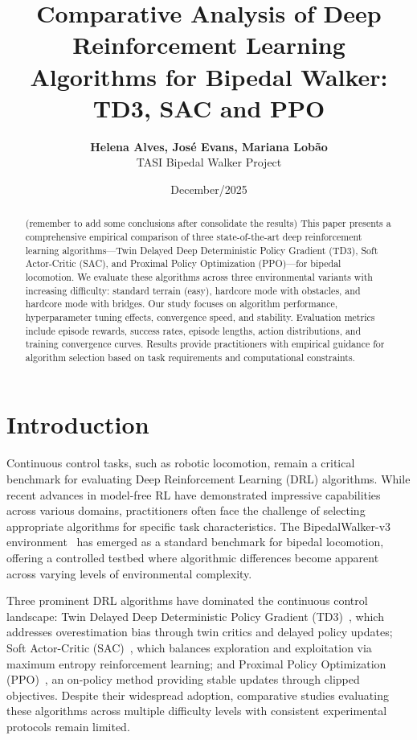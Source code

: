 \documentclass[10pt,a4paper,twocolumn]{article}
\title{Comparative Analysis of Deep Reinforcement Learning Algorithms for Bipedal Walker: TD3, SAC and PPO}
\author{
    \textbf{Helena Alves, José Evans, Mariana Lobão}\\
    TASI Bipedal Walker Project
}
\date{December/2025}
\begin{document}
\maketitle

\begin{abstract}
(remember to add some conclusions after consolidate the results) This paper presents a comprehensive empirical comparison of three state-of-the-art deep reinforcement learning algorithms---Twin Delayed Deep Deterministic Policy Gradient (TD3), Soft Actor-Critic (SAC), and Proximal Policy Optimization (PPO)---for bipedal locomotion. We evaluate these algorithms across three environmental variants with increasing difficulty: standard terrain (easy), hardcore mode with obstacles, and hardcore mode with bridges. Our study focuses on algorithm performance, hyperparameter tuning effects, convergence speed, and stability. Evaluation metrics include episode rewards, success rates, episode lengths, action distributions, and training convergence curves. Results provide practitioners with empirical guidance for algorithm selection based on task requirements and computational constraints.
\end{abstract}

\section{Introduction}

Continuous control tasks, such as robotic locomotion, remain a critical benchmark for evaluating Deep Reinforcement Learning (DRL) algorithms. While recent advances in model-free RL have demonstrated impressive capabilities across various domains, practitioners often face the challenge of selecting appropriate algorithms for specific task characteristics. The BipedalWalker-v3 environment~\cite{brockman2016openai} has emerged as a standard benchmark for bipedal locomotion, offering a controlled testbed where algorithmic differences become apparent across varying levels of environmental complexity.

Three prominent DRL algorithms have dominated the continuous control landscape: Twin Delayed Deep Deterministic Policy Gradient (TD3)~\cite{fujimoto2018addressing}, which addresses overestimation bias through twin critics and delayed policy updates; Soft Actor-Critic (SAC)~\cite{haarnoja2018soft}, which balances exploration and exploitation via maximum entropy reinforcement learning; and Proximal Policy Optimization (PPO)~\cite{schulman2017proximal}, an on-policy method providing stable updates through clipped objectives. Despite their widespread adoption, comparative studies evaluating these algorithms across multiple difficulty levels with consistent experimental protocols remain limited.
\end{document}
